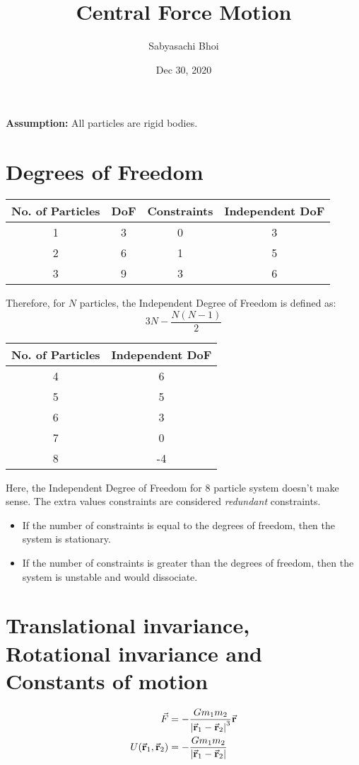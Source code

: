 \documentclass[12pt]{article}
\theoremstyle{definition}
\theoremstyle{definition}
\begin{document}
\title{Central Force Motion}
\author{Sabyasachi Bhoi}
\date{ Dec 30, 2020 }
\maketitle

\textbf{Assumption:} All particles are rigid bodies.

\section{Degrees of Freedom}

\begin{center}
	\begin{tabular}{|c|c|c|c|}
		\hline
		No. of Particles & DoF & Constraints & Independent DoF \\
		\hline
		1 & 3 & 0 & 3 \\
		\hline
		2 & 6 & 1 & 5 \\
		\hline
		3 & 9 & 3 & 6 \\
		\hline
	\end{tabular}
\end{center}

Therefore, for $N$ particles, the Independent Degree of Freedom is defined as:
\[
	3N - \frac{N(N-1)}{2}
\]

\begin{center}
	\begin{tabular}{|c|c|}
		\hline 
		No. of Particles & Independent DoF \\
		\hline 
		4 & 6 \\
		\hline 
		5 & 5 \\
		\hline 
		6 & 3 \\
		\hline 
		7 & 0 \\
		\hline 
		8 & -4 \\
		\hline 
	\end{tabular}
\end{center}

Here, the Independent Degree of Freedom for 8 particle system doesn't make sense. The extra values constraints are considered \textit{redundant} constraints. 

\begin{itemize}
	\item If the number of constraints is equal to the degrees of freedom, then the system is stationary.
	\item If the number of constraints is greater than the degrees of freedom, then the system is unstable and would dissociate. 
\end{itemize}

\section{Translational invariance, Rotational invariance and Constants of motion}

\begin{align*}
	\vec{F} &=  -\frac{G m_1 m_2}{ \abs{\va{r}_1 - \va{r}_2}^3 } \va{r} \\
	U \qty(\va{r}_1, \va{r}_2) &=  - \frac{G m_1 m_2}{\abs{\va{r}_1 - \va{r}_2}}
\end{align*}
\end{document}
